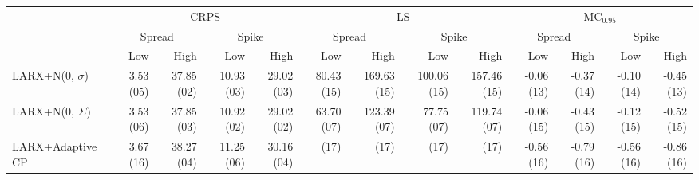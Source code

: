 \begin{tabular}{lrrrrrrrrrrrr}
\toprule
 & \multicolumn{4}{c}{CRPS} & \multicolumn{4}{c}{LS} & \multicolumn{4}{c}{$\text{MC}_{0.95}$} \\
 & \multicolumn{2}{c}{Spread} & \multicolumn{2}{c}{Spike} & \multicolumn{2}{c}{Spread} & \multicolumn{2}{c}{Spike} & \multicolumn{2}{c}{Spread} & \multicolumn{2}{c}{Spike} \\
 & Low & High & Low & High & Low & High & Low & High & Low & High & Low & High \\
\midrule
LARX+N(0, $\sigma$) & {\cellcolor[HTML]{DCD8D8}} \color[HTML]{000000} 3.53 (05) & {\cellcolor[HTML]{309494}} \color[HTML]{F1F1F1} 37.85 (02) & {\cellcolor[HTML]{399898}} \color[HTML]{F1F1F1} 10.93 (03) & {\cellcolor[HTML]{269090}} \color[HTML]{F1F1F1} 29.02 (03) & {\cellcolor[HTML]{CD5C5C}} \color[HTML]{F1F1F1} 80.43 (15) & {\cellcolor[HTML]{CD5C5C}} \color[HTML]{F1F1F1} 169.63 (15) & {\cellcolor[HTML]{CD5C5C}} \color[HTML]{F1F1F1} 100.06 (15) & {\cellcolor[HTML]{CD5C5C}} \color[HTML]{F1F1F1} 157.46 (15) & {\cellcolor[HTML]{8ABABA}} \color[HTML]{000000} -0.06 (13) & {\cellcolor[HTML]{D18282}} \color[HTML]{F1F1F1} -0.37 (14) & {\cellcolor[HTML]{D5A4A4}} \color[HTML]{000000} -0.10 (14) & {\cellcolor[HTML]{D6AAAA}} \color[HTML]{000000} -0.45 (13) \\
LARX+N(0, $\Sigma$) & {\cellcolor[HTML]{DBD6D6}} \color[HTML]{000000} 3.53 (06) & {\cellcolor[HTML]{309494}} \color[HTML]{F1F1F1} 37.85 (03) & {\cellcolor[HTML]{379797}} \color[HTML]{F1F1F1} 10.92 (02) & {\cellcolor[HTML]{269090}} \color[HTML]{F1F1F1} 29.02 (02) & {\cellcolor[HTML]{A6C5C5}} \color[HTML]{000000} 63.70 (07) & {\cellcolor[HTML]{72B0B0}} \color[HTML]{F1F1F1} 123.39 (07) & {\cellcolor[HTML]{8ABABA}} \color[HTML]{000000} 77.75 (07) & {\cellcolor[HTML]{B5CCCC}} \color[HTML]{000000} 119.74 (07) & {\cellcolor[HTML]{96BFBF}} \color[HTML]{000000} -0.06 (15) & {\cellcolor[HTML]{D07979}} \color[HTML]{F1F1F1} -0.43 (15) & {\cellcolor[HTML]{D49B9B}} \color[HTML]{F1F1F1} -0.12 (15) & {\cellcolor[HTML]{D49999}} \color[HTML]{F1F1F1} -0.52 (15) \\
LARX+Adaptive CP & {\cellcolor[HTML]{CD5C5C}} \color[HTML]{F1F1F1} 3.67 (16) & {\cellcolor[HTML]{379797}} \color[HTML]{F1F1F1} 38.27 (04) & {\cellcolor[HTML]{5BA6A6}} \color[HTML]{F1F1F1} 11.25 (06) & {\cellcolor[HTML]{3C9999}} \color[HTML]{F1F1F1} 30.16 (04) & {\cellcolor[HTML]{FFFFFF}} \color[HTML]{000000}  (17) & {\cellcolor[HTML]{FFFFFF}} \color[HTML]{000000}  (17) & {\cellcolor[HTML]{FFFFFF}} \color[HTML]{000000}  (17) & {\cellcolor[HTML]{FFFFFF}} \color[HTML]{000000}  (17) & {\cellcolor[HTML]{CD5C5C}} \color[HTML]{F1F1F1} -0.56 (16) & {\cellcolor[HTML]{CD5C5C}} \color[HTML]{F1F1F1} -0.79 (16) & {\cellcolor[HTML]{CD5C5C}} \color[HTML]{F1F1F1} -0.56 (16) & {\cellcolor[HTML]{CD5C5C}} \color[HTML]{F1F1F1} -0.86 (16) \\

\end{tabular}
